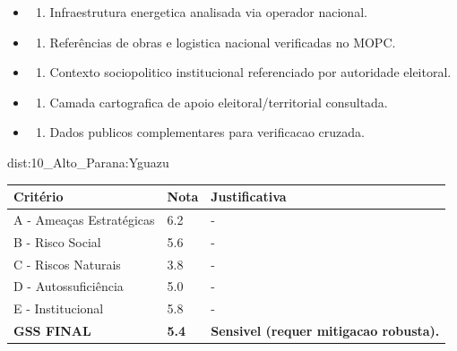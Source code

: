 {\begin{itemize}
\item
  \begin{enumerate}
  \def\labelenumi{\arabic{enumi})}
  \setcounter{enumi}{7}
  \tightlist
  \item
    Infraestrutura energetica analisada via operador nacional.
  \end{enumerate}
\item
  \begin{enumerate}
  \def\labelenumi{\arabic{enumi})}
  \setcounter{enumi}{8}
  \tightlist
  \item
    Referências de obras e logistica nacional verificadas no MOPC.
  \end{enumerate}
\item
  \begin{enumerate}
  \def\labelenumi{\arabic{enumi})}
  \setcounter{enumi}{9}
  \tightlist
  \item
    Contexto sociopolitico institucional referenciado por autoridade
    eleitoral.
  \end{enumerate}
\item
  \begin{enumerate}
  \def\labelenumi{\arabic{enumi})}
  \setcounter{enumi}{10}
  \tightlist
  \item
    Camada cartografica de apoio eleitoral/\allowbreak territorial consultada.
  \end{enumerate}
\item
  \begin{enumerate}
  \def\labelenumi{\arabic{enumi})}
  \setcounter{enumi}{11}
  \tightlist
  \item
    Dados publicos complementares para verificacao cruzada.
  \end{enumerate}
\end{itemize}}{dist:10_Alto_Parana:Yguazu}
\begin{table}[ht!]
\small \begin{tabular}{p{3.0cm}p{0.8cm}p{6.0cm}} \toprule
\textbf{Critério} & \textbf{Nota} & \textbf{Justificativa} \\ \midrule
A - Ameaças Estratégicas & 6.2 & - \\
B - Risco Social & 5.6 & - \\
C - Riscos Naturais & 3.8 & - \\
D - Autossuficiência & 5.0 & - \\
E - Institucional & 5.8 & - \\
\midrule \textbf{GSS FINAL} & \textbf{5.4} & \textbf{Sensivel (requer mitigacao robusta).} \\ \bottomrule \end{tabular}
\end{table}
